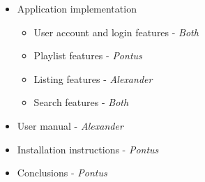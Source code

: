 \begin{itemize}
    \item Application implementation
        \begin{itemize}
            \item User account and login features - \emph{Both}
            \item Playlist features - \emph{Pontus}
            \item Listing features - \emph{Alexander}
            \item Search features - \emph{Both}
        \end{itemize}
    \item User manual - \emph{Alexander}
    \item Installation instructions - \emph{Pontus}
    \item Conclusions - \emph{Pontus}
\end{itemize}
